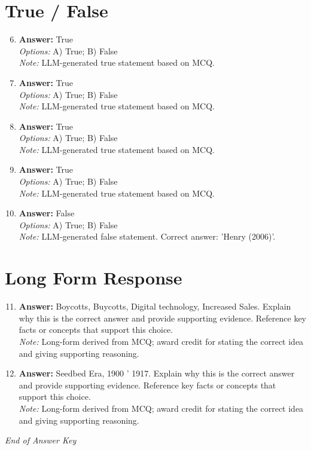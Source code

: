 \documentclass[12pt]{article}
\begin{document}
\section*{True / False}
\begin{enumerate}[label=\arabic*.]
\setcounter{enumi}{5}
\item \textbf{Answer:} True
\\ \textit{Options:} A) True; B) False
\\ \textit{Note:} LLM-generated true statement based on MCQ.
\item \textbf{Answer:} True
\\ \textit{Options:} A) True; B) False
\\ \textit{Note:} LLM-generated true statement based on MCQ.
\item \textbf{Answer:} True
\\ \textit{Options:} A) True; B) False
\\ \textit{Note:} LLM-generated true statement based on MCQ.
\item \textbf{Answer:} True
\\ \textit{Options:} A) True; B) False
\\ \textit{Note:} LLM-generated true statement based on MCQ.
\item \textbf{Answer:} False
\\ \textit{Options:} A) True; B) False
\\ \textit{Note:} LLM-generated false statement. Correct answer: 'Henry (2006)'.
\end{enumerate}

\section*{Long Form Response}
\begin{enumerate}[label=\arabic*.]
\setcounter{enumi}{10}
\item \textbf{Answer:} Boycotts, Buycotts, Digital technology, Increased Sales. Explain why this is the correct answer and provide supporting evidence. Reference key facts or concepts that support this choice.
\\ \textit{Note:} Long-form derived from MCQ; award credit for stating the correct idea and giving supporting reasoning.
\item \textbf{Answer:} Seedbed Era, 1900 ' 1917. Explain why this is the correct answer and provide supporting evidence. Reference key facts or concepts that support this choice.
\\ \textit{Note:} Long-form derived from MCQ; award credit for stating the correct idea and giving supporting reasoning.
\end{enumerate}

\vfill
\noindent\textit{End of Answer Key}
\end{document}
